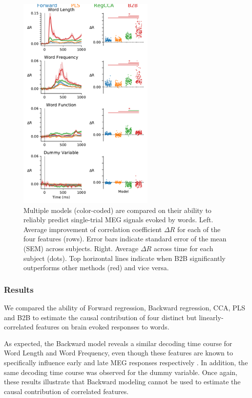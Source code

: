 \begin{figure}
  \begin{center}
    \includegraphics[width=0.6\textwidth,
                     trim=0cm 0cm 0cm 0cm, clip=True]{figures/meg.pdf}
  \end{center}
  \caption{Multiple models (color-coded) are compared on their ability to
  reliably predict single-trial MEG signals evoked by words. Left. Average
  improvement of correlation coefficient $\Delta R$ for each of the four
  features (rows). Error bars indicate standard error of the mean (SEM) across
  subjects. Right. Average $\Delta R$ across time for each subject (dots). Top
  horizontal lines indicate when B2B significantly outperforms other methods
  (red) and vice versa. \label{fig:meg_results}
}
\end{figure}


\subsubsection{Results}
We compared the ability of Forward regression, Backward regression, CCA, PLS and
B2B to estimate the causal contribution of four distinct but linearly-correlated features
on brain evoked responses to words.

As expected, the Backward model reveals a similar decoding time course for Word
Length and Word Frequency, even though these features are known to specifically
influence early and late MEG responses respectively \citep{kutas2011thirty}. In
addition, the same decoding time course was observed for the dummy variable.
Once again, these results illustrate that Backward modeling cannot be used to estimate the
causal contribution of correlated features.

